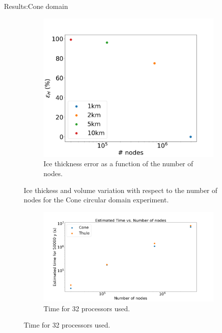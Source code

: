 \documentclass[11pt]{beamer}
\begin{document}
\begin{frame}[allowframebreaks]{Results:Cone domain}
\begin{figure}
\begin{subfigure}{.45\textwidth}
			\end{subfigure}
			\begin{subfigure}{.45\textwidth}
				\centering
				\includegraphics[width=1.1\linewidth]{../fig/H_CONE_full_all_res_vs_num_nodes.png}
				\caption{Ice thickness error as a function of the number of nodes.}
				\label{H_CONE_VS_NODES}
			\end{subfigure}
			\caption{Ice thickess and volume variation with respect to the number of nodes for the Cone circular domain experiment.}
			\label{H_CONE_VS_TIME_VS_NODES}
		\end{figure}
		\begin{figure}
			\centering
			\begin{subfigure}{.5\textwidth}
				\centering
				\includegraphics[width=1.1\linewidth]{../fig/Figure_Time_vs_nodes_Segundos.png}
				\caption{Time for 32 processors used.}
				\label{32_proce}

\end{subfigure}
\end{figure}
\end{frame}
\end{document}
